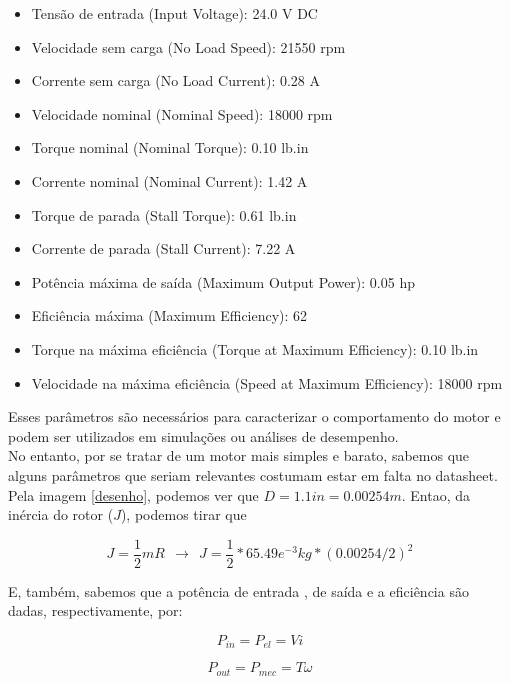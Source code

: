 \documentclass[a4paper, 12pt]{article}
\begin{document}
\begin{itemize}
    \item Tensão de entrada (Input Voltage): 24.0 V DC
    \item Velocidade sem carga (No Load Speed): 21550 rpm
    \item Corrente sem carga (No Load Current): 0.28 A
    \item Velocidade nominal (Nominal Speed): 18000 rpm
    \item Torque nominal (Nominal Torque): 0.10 lb.in
    \item Corrente nominal (Nominal Current): 1.42 A
    \item Torque de parada (Stall Torque): 0.61 lb.in
    \item Corrente de parada (Stall Current): 7.22 A
    \item Potência máxima de saída (Maximum Output Power): 0.05 hp
    \item Eficiência máxima (Maximum Efficiency): 62%
    \item Torque na máxima eficiência (Torque at Maximum Efficiency): 0.10 lb.in
    \item Velocidade na máxima eficiência (Speed at Maximum Efficiency): 18000 rpm
\end{itemize}

Esses parâmetros são necessários para caracterizar o comportamento do motor e podem ser utilizados em simulações ou análises de desempenho.\\

No entanto, por se tratar de um motor mais simples e barato, sabemos que alguns parâmetros que seriam relevantes costumam estar em falta no datasheet.\\

Pela imagem \ref{desenho}, podemos ver que $D = 1.1 in = 0.00254m$. Entao, da inércia do rotor ($J$), podemos tirar que

\begin{equation}
    J = \frac{1}{2}mR \>\ \longrightarrow \>\ J = \frac{1}{2} *65.49e^{-3}kg*(0.00254/2)^2
\end{equation}

E, também, sabemos que a potência de entrada , de saída e a eficiência são dadas, respectivamente, por:

\begin{equation}
    P_{in} = P_{el} = Vi
\end{equation}

\begin{equation}
    P_{out} = P_{mec} = T \omega
\end{equation}
\end{document}
